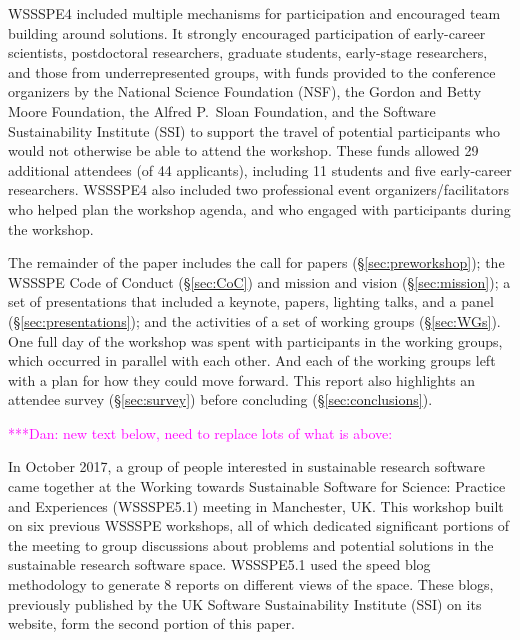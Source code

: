 \documentclass[11pt, oneside]{amsart}
\newcommand{\todo}[1]{{\color{blue}$\blacksquare$~\textsf{[TODO: #1]}}}
\newcommand{\katznote}[1]{ {\textcolor{magenta}    { ***Dan:      #1 }}}
\begin{document}
WSSSPE4 included multiple mechanisms for participation and
encouraged team building around solutions. It strongly encouraged participation
of early-career scientists, postdoctoral researchers, graduate students,
early-stage researchers, and those from underrepresented groups,
with funds provided to the conference organizers by the National Science
Foundation (NSF), the Gordon and Betty Moore Foundation, the Alfred P.~Sloan Foundation, and the Software
Sustainability Institute (SSI) to support the travel of potential participants
who would not otherwise be able to attend the workshop. These
funds allowed 29 additional attendees %
(of 44 applicants),
including 11 students and five early-career
researchers.
%
WSSSPE4 also included two professional event organizers/facilitators who helped
plan the workshop agenda,
and who engaged with participants during the workshop.

The remainder of the paper includes the call for papers (\S\ref{sec:preworkshop}); the WSSSPE Code of Conduct (\S\ref{sec:CoC}) and mission and vision (\S\ref{sec:mission}); a set of presentations that included a keynote, papers, lighting talks, and a panel (\S\ref{sec:presentations}); and the activities of a set of working groups (\S\ref{sec:WGs}).  One full day of the
workshop was spent with participants in the working groups, which occurred in parallel
with each other.  And each of the working groups left with a plan for how they could move
forward.
This report also highlights an attendee survey (\S\ref{sec:survey}) before concluding (\S\ref{sec:conclusions}).

\katznote{new text below, need to replace lots of what is above:}

In October 2017, a group of people interested in sustainable research software came together at the Working towards Sustainable Software for Science: Practice and Experiences (WSSSPE5.1) meeting in Manchester, UK. This workshop built on six previous WSSSPE workshops, all of which dedicated significant portions of the meeting to group discussions about problems and potential solutions in the sustainable research software space.  WSSSPE5.1 used the speed blog methodology to generate 8 reports on different views of the space. These blogs, previously published by the UK Software Sustainability Institute (SSI) on its website, form the second portion of this paper.
\end{document}
